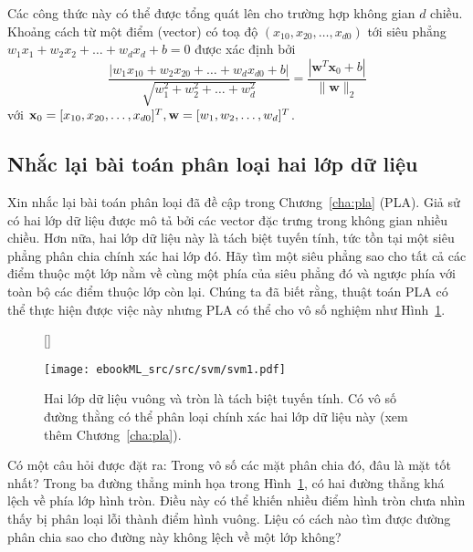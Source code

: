 Các công thức này có thể được tổng quát lên cho trường hợp không gian $d$ chiều.
Khoảng cách từ một điểm (vector) có toạ độ $(x_{10}, x_{20}, \dots, x_{d0})$ tới
{siêu phẳng} $w_1x_1 + w_2x_2 +
\dots + w_dx_d   + b = 0$ được xác định bởi
\begin{equation*}
\frac{|w_1x_{10} + w_2x_{20} + \dots +
w_dx_{d0} + b|}{\sqrt{w_1^2 + w_2^2 + \dots +
w_d^2}} = \frac{|\mathbf{w}^T\mathbf{x}_0 + b|}{\|\mathbf{w}\|_2}
\end{equation*}
với $\mathbf{x}_0 = [x_{10}, x_{20}, \dots, x_{d0}]^T, \mathbf{w} = [w_1, w_2,
\dots, w_d]^T$.


\subsection{Nhắc lại bài toán phân loại hai lớp dữ liệu}

Xin nhắc lại bài toán phân loại đã đề cập trong
Chương~\ref{cha:pla} (PLA). Giả sử có hai
lớp dữ liệu được mô tả bởi các vector đặc trưng trong không gian nhiều
chiều. Hơn nữa, hai lớp dữ liệu này là tách biệt tuyến tính, tức tồn
tại một siêu phẳng phân chia chính xác hai lớp đó. Hãy tìm một siêu phẳng sao cho tất cả các điểm thuộc một lớp nằm về cùng một
phía của siêu phẳng đó và ngược phía với toàn bộ các điểm thuộc lớp còn lại.
Chúng ta đã biết rằng, thuật toán PLA có thể thực hiện được việc này nhưng PLA có thể cho vô số nghiệm như Hình~\ref{fig:19_linsep}.

\begin{figure}[t]
[\FBwidth]
{\caption[]{Hai lớp dữ liệu vuông và tròn là tách biệt tuyến tính. Có
vô số đường thằng có thể phân loại chính xác hai lớp dữ liệu này (xem
thêm Chương~\ref{cha:pla}).}
\label{fig:19_linsep}}
{\texttt{[image: ebookML\_src/src/svm/svm1.pdf]}}
\end{figure}

Có một câu hỏi được đặt ra: Trong vô số các mặt phân chia đó, đâu là mặt
tốt nhất? Trong ba đường thẳng minh họa trong Hình~\ref{fig:19_linsep}, có hai
đường thẳng khá lệch về phía lớp hình tròn. Điều này có thể khiến nhiều điểm hình tròn chưa nhìn thấy bị phân loại lỗi thành điểm hình vuông. Liệu có
cách nào tìm được đường phân chia sao cho đường này không lệch về một lớp không?

